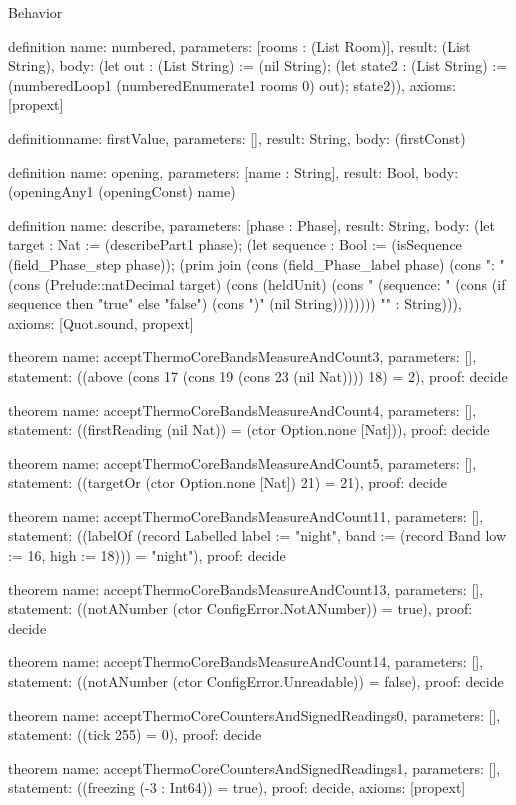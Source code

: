 \begin{lexlean}{Behavior}
\begin{semanticmodule}
definition{
  name: numbered,
  parameters: [rooms : (List Room)],
  result: (List String),
  body: (let out : (List String) := (nil String); (let state2 : (List String) := (numberedLoop1 (numberedEnumerate1 rooms 0) out); state2)),
  axioms: [propext]
}

definition{name: firstValue, parameters: [], result: String, body: (firstConst)}

definition{
  name: opening,
  parameters: [name : String],
  result: Bool,
  body: (openingAny1 (openingConst) name)
}

definition{
  name: describe,
  parameters: [phase : Phase],
  result: String,
  body: (let target : Nat := (describePart1 phase); (let sequence : Bool := (isSequence (field_Phase_step phase)); (prim join (cons (field_Phase_label phase) (cons ": " (cons (Prelude::natDecimal target) (cons (heldUnit) (cons " (sequence: " (cons (if sequence then "true" else "false") (cons ")" (nil String)))))))) "" : String))),
  axioms: [Quot.sound, propext]
}

theorem{
  name: acceptThermoCoreBandsMeasureAndCount3,
  parameters: [],
  statement: ((above (cons 17 (cons 19 (cons 23 (nil Nat)))) 18) = 2),
  proof: decide{}
}

theorem{
  name: acceptThermoCoreBandsMeasureAndCount4,
  parameters: [],
  statement: ((firstReading (nil Nat)) = (ctor Option.none [Nat])),
  proof: decide{}
}

theorem{
  name: acceptThermoCoreBandsMeasureAndCount5,
  parameters: [],
  statement: ((targetOr (ctor Option.none [Nat]) 21) = 21),
  proof: decide{}
}

theorem{
  name: acceptThermoCoreBandsMeasureAndCount11,
  parameters: [],
  statement: ((labelOf (record Labelled {label := "night", band := (record Band {low := 16, high := 18})})) = "night"),
  proof: decide{}
}

theorem{
  name: acceptThermoCoreBandsMeasureAndCount13,
  parameters: [],
  statement: ((notANumber (ctor ConfigError.NotANumber)) = true),
  proof: decide{}
}

theorem{
  name: acceptThermoCoreBandsMeasureAndCount14,
  parameters: [],
  statement: ((notANumber (ctor ConfigError.Unreadable)) = false),
  proof: decide{}
}

theorem{
  name: acceptThermoCoreCountersAndSignedReadings0,
  parameters: [],
  statement: ((tick 255) = 0),
  proof: decide{}
}

theorem{
  name: acceptThermoCoreCountersAndSignedReadings1,
  parameters: [],
  statement: ((freezing (-3 : Int64)) = true),
  proof: decide{},
  axioms: [propext]
}


\end{semanticmodule}
\end{lexlean}
